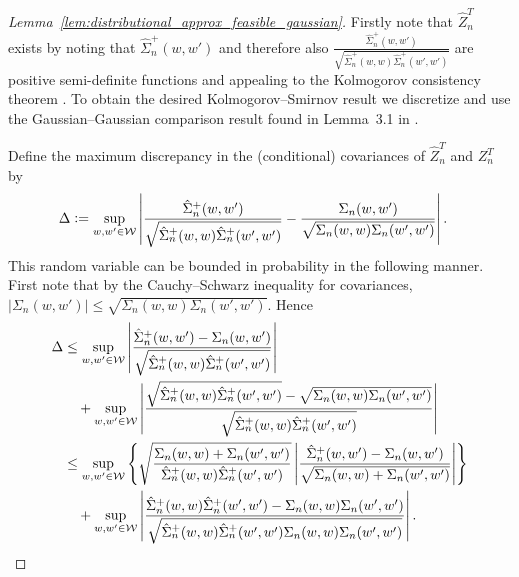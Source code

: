 \begin{proof}[Lemma~\ref{lem:distributional_approx_feasible_gaussian}]

  Firstly note that $\hat Z_n^T$ exists
  by noting that $\hat \Sigma_n^+(w,w')$ and therefore also
  $\frac{\hat \Sigma_n^+(w,w')}
  {\sqrt{\hat \Sigma_n^+(w,w) \hat \Sigma_n^+(w',w')}}$
  are positive semi-definite
  functions and appealing to the
  Kolmogorov consistency theorem \citep{gine2021mathematical}.
  To obtain the desired Kolmogorov--Smirnov result we discretize and
  use the Gaussian--Gaussian comparison result found in
  Lemma~3.1 in \citet{chernozhukov2013gaussian}.


  Define the maximum discrepancy in the (conditional) covariances
  of $\hat Z_n^T$ and $Z_n^T$ by
  \begin{align*}
    \Delta
    &\vcentcolon=
    \sup_{w, w' \in \mathcal{W}}
    \left|
    \frac{\hat \Sigma_n^+(w,w')}
    {\sqrt{\hat \Sigma_n^+(w,w) \hat \Sigma_n^+(w',w')}}
    - \frac{\Sigma_n(w,w')}
    {\sqrt{\Sigma_n(w,w) \Sigma_n(w',w')}}
    \right|.
  \end{align*}
  This random variable can be bounded in probability
  in the following manner.
  First note that by the Cauchy--Schwarz inequality
  for covariances,
  $|\Sigma_n(w,w')| \leq
  \sqrt{\Sigma_n(w,w) \Sigma_n(w',w')}$.
  Hence
  \begin{align*}
    \Delta
    &\leq
    \sup_{w, w' \in \mathcal{W}}
    \left|
    \frac{\hat \Sigma_n^+(w,w') - \Sigma_n(w,w')}
    {\sqrt{\hat \Sigma_n^+(w,w) \hat \Sigma_n^+(w',w')}}
    \right| \\
    &\quad+
    \sup_{w, w' \in \mathcal{W}}
    \left|
    \frac{\sqrt{\hat \Sigma_n^+(w,w) \hat \Sigma_n^+(w',w')}
    - \sqrt{\Sigma_n(w,w) \Sigma_n(w',w')}}
    {\sqrt{\hat \Sigma_n^+(w,w) \hat \Sigma_n^+(w',w')}}
    \right| \\
    &\leq
    \sup_{w, w' \in \mathcal{W}}
    \left\{
      \sqrt{\frac{\Sigma_n(w,w) + \Sigma_n(w',w')}
      {\hat \Sigma_n^+(w,w) \hat \Sigma_n^+(w',w')}}
      \left|
      \frac{\hat \Sigma_n^+(w,w') - \Sigma_n(w,w')}
      {\sqrt{\Sigma_n(w,w) + \Sigma_n(w',w')}}
      \right|
    \right\} \\
    &\quad+
    \sup_{w, w' \in \mathcal{W}}
    \left|
    \frac{\hat \Sigma_n^+(w,w)\hat \Sigma_n^+(w',w')
    - \Sigma_n(w,w) \Sigma_n(w',w')}
    {\sqrt{\hat \Sigma_n^+(w,w) \hat \Sigma_n^+(w',w')
    \Sigma_n(w,w) \Sigma_n(w',w')}}
    \right|.
  \end{align*}

\end{proof}

